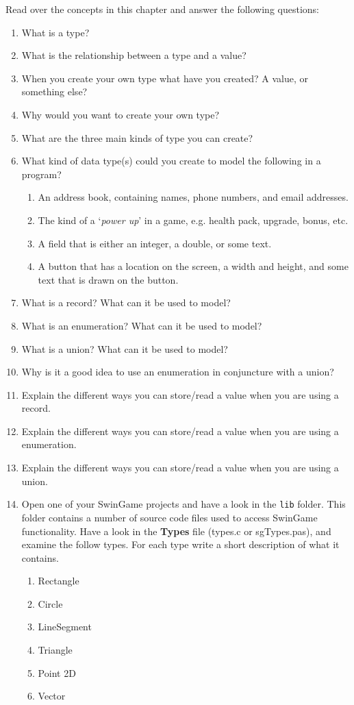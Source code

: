 Read over the concepts in this chapter and answer the following questions:
\begin{enumerate}
  \item What is a type?
  \item What is the relationship between a type and a value? 
  \item When you create your own type what have you created? A value, or something else?
  \item Why would you want to create your own type?
  \item What are the three main kinds of type you can create?
  \item What kind of data type(s) could you create to model the following in a program?
  \begin{enumerate}
    \item An address book, containing names, phone numbers, and email addresses.
    \item The kind of a `\emph{power up}' in a game, e.g. health pack, upgrade, bonus, etc.
    \item A field that is either an integer, a double, or some text.
    \item A button that has a location on the screen, a width and height, and some text that is drawn on the button.
  \end{enumerate}
  \item What is a record? What can it be used to model?
  \item What is an enumeration? What can it be used to model?
  \item What is a union? What can it be used to model?
  \item Why is it a good idea to use an enumeration in conjuncture with a union?
  \item Explain the different ways you can store/read a value when you are using a record.
  \item Explain the different ways you can store/read a value when you are using a enumeration.
  \item Explain the different ways you can store/read a value when you are using a union.
  \item Open one of your SwinGame projects and have a look in the \texttt{lib} folder. This folder contains a number of source code files used to access SwinGame functionality. Have a look in the \textbf{Types} file (types.c or sgTypes.pas), and examine the follow types. For each type write a short description of what it contains.
  \begin{enumerate}
    \item Rectangle
    \item Circle
    \item LineSegment
    \item Triangle
    \item Point 2D
    \item Vector
  \end{enumerate}
\end{enumerate}

